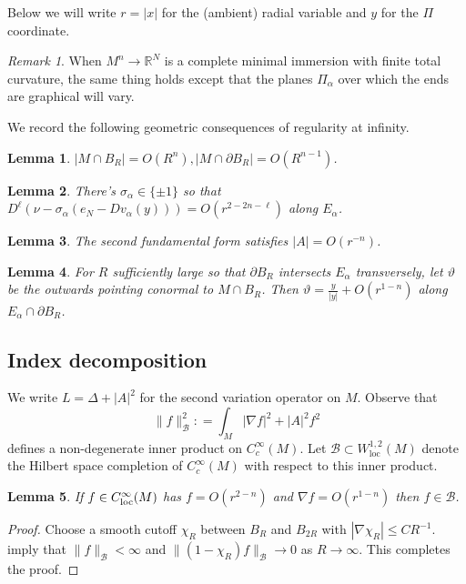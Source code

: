 \documentclass[11pt]{amsart}
\numberwithin{equation}{section}
\theoremstyle{plain}
\newtheorem{lemma}[lemma]{Lemma}
\theoremstyle{definition}
\theoremstyle{remark}
\newtheorem{remark}[remark]{Remark}
\newcommand{\R}{\mathbb{R}}
\newcommand{\Bcal}{\mathcal B}
\begin{document}
Below we will write $r=|x|$ for the (ambient) radial variable and $y$ for the $\Pi$ coordinate.

\begin{remark}
When $M^n \to \R^N$ is a complete minimal immersion with finite total curvature, the same thing holds except that the planes $\Pi_\alpha$ over which the ends are graphical will vary. 
\end{remark}

We record the following geometric consequences of regularity at infinity. 

\begin{lemma}\label{lemm:vol-grow}
$|M\cap B_R| = O(R^n), |M\cap\partial B_R| = O(R^{n-1})$.
\end{lemma}
\begin{lemma}\label{lemm:unit-normal-lim}
There's $\sigma_\alpha \in\{\pm 1\}$ so that $D^\ell(\nu - \sigma_\alpha (e_N-D v_\alpha(y)))  = O(r^{2-2n-\ell})$ along $E_\alpha$. 
\end{lemma}
\begin{lemma}\label{lemm:sff-decay}
The second fundamental form satisfies $|A| = O(r^{-n})$. 
\end{lemma}
\begin{lemma}\label{lemm:conormal}
For $R$ sufficiently large so that $\partial B_R$ intersects $E_\alpha$ transversely, let $\vartheta$ be the outwards pointing conormal to $M\cap B_R$. Then $\vartheta = \frac{y}{|y|} + O(r^{1-n})$ along $E_\alpha \cap\partial B_R$.
\end{lemma}


\subsection{Index decomposition} 

We write $L = \Delta + |A|^2$ for the second variation operator on $M$. Observe that 
\begin{equation}\label{eq:Bcal-def}
\|f\|_\Bcal^2 : = \int_M |\nabla f|^2 + |A|^2 f^2
\end{equation}
defines a non-degenerate inner product on $C^\infty_c(M)$. Let $\Bcal \subset W^{1,2}_\textrm{loc}(M)$ denote the Hilbert space completion of $C^\infty_c(M)$ with respect to this inner product. 

\begin{lemma}\label{lemm:f-in-B-from-decay}
If $f \in C^\infty_\textnormal{loc}(M)$ has $f = O(r^{2-n})$ and $\nabla f = O(r^{1-n})$ then $f \in \Bcal$. 
\end{lemma}
\begin{proof}
 Choose  a smooth cutoff $\chi_R$ between $B_R$ and $B_{2R}$ with $|\nabla \chi_R|\leq CR^{-1}$.  imply that $\|f\|_\Bcal < \infty$ and $\|(1-\chi_R)f\|_\Bcal \to 0$ as $R\to\infty$. This completes the proof. 
\end{proof}
\end{document}

